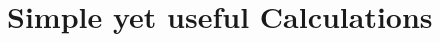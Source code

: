\documentclass[11pt, a4paper, BCOR=10mm, DIV=11]{scrbook}
\theoremstyle{definition}
\theoremstyle{plain}
\begin{document}
%

%

\chapter{Simple yet useful Calculations} 



\printnomenclature

{}

\end{document}

